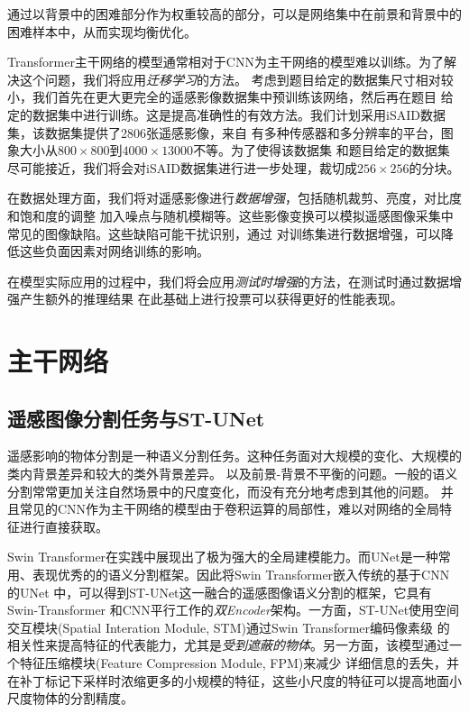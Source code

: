 \documentclass[a4paper,twoside,zihao=5,UTF8]{ctexrep}
\begin{document}
通过以背景中的困难部分作为权重较高的部分，可以是网络集中在前景和背景中的困难样本中，从而实现均衡优化。

Transformer主干网络的模型通常相对于CNN为主干网络的模型难以训练。为了解决这个问题，我们将应用\emph{迁移学习}的方法。
考虑到题目给定的数据集尺寸相对较小，我们首先在更大更完全的遥感影像数据集中预训练该网络，然后再在题目
给定的数据集中进行训练。这是提高准确性的有效方法。我们计划采用iSAID数据集\cite{isaid}，该数据集提供了2806张遥感影像，来自
有多种传感器和多分辨率的平台，图象大小从$800\times800$到$4000\times13000$不等。为了使得该数据集
和题目给定的数据集尽可能接近，我们将会对iSAID数据集进行进一步处理，裁切成$256\times256$的分块。

在数据处理方面，我们将对遥感影像进行\emph{数据增强}，包括随机裁剪、亮度，对比度和饱和度的调整
加入噪点与随机模糊等。这些影像变换可以模拟遥感图像采集中常见的图像缺陷。这些缺陷可能干扰识别，通过
对训练集进行数据增强，可以降低这些负面因素对网络训练的影响。

在模型实际应用的过程中，我们将会应用\emph{测试时增强}的方法，在测试时通过数据增强产生额外的推理结果
在此基础上进行投票可以获得更好的性能表现。


\chapter{主干网络}

\section{遥感图像分割任务与ST-UNet}
遥感影响的物体分割是一种语义分割任务。这种任务面对大规模的变化、大规模的类内背景差异和较大的类外背景差异。
以及前景-背景不平衡的问题。一般的语义分割常常更加关注自然场景中的尺度变化，而没有充分地考虑到其他的问题\cite{farseg}。
并且常见的CNN作为主干网络的模型由于卷积运算的局部性，难以对网络的全局特征进行直接获取。

Swin Transformer在实践中展现出了极为强大的全局建模能力。而UNet是一种常用、表现优秀的的语义分割框架。因此将Swin Transformer嵌入传统的基于CNN的UNet
中，可以得到ST-UNet这一融合的遥感图像语义分割的框架\cite{stunet}，它具有Swin-Transformer
和CNN平行工作的\emph{双Encoder}架构。一方面，ST-UNet使用空间交互模块(Spatial Interation Module, STM)通过Swin Transformer编码像素级
的相关性来提高特征的代表能力，尤其是\emph{受到遮蔽的物体}。另一方面，该模型通过一个特征压缩模块(Feature Compression Module, FPM)来减少
详细信息的丢失，并在补丁标记下采样时浓缩更多的小规模的特征，这些小尺度的特征可以提高地面小尺度物体的分割精度。
\end{document}
